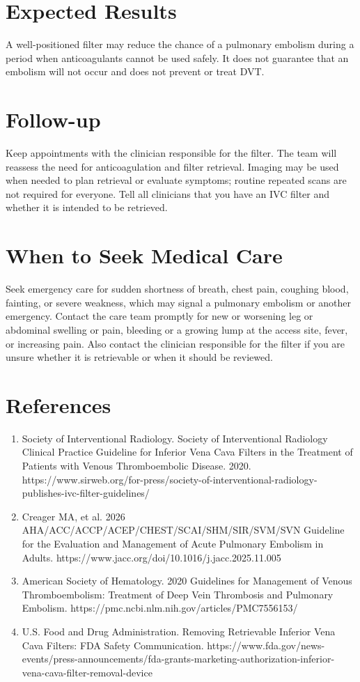 \section*{Expected Results}
A well-positioned filter may reduce the chance of a pulmonary embolism during a period when anticoagulants cannot be used safely. It does not guarantee that an embolism will not occur and does not prevent or treat DVT.

\section*{Follow-up}
Keep appointments with the clinician responsible for the filter. The team will reassess the need for anticoagulation and filter retrieval. Imaging may be used when needed to plan retrieval or evaluate symptoms; routine repeated scans are not required for everyone. Tell all clinicians that you have an IVC filter and whether it is intended to be retrieved.

\section*{When to Seek Medical Care}
Seek emergency care for sudden shortness of breath, chest pain, coughing blood, fainting, or severe weakness, which may signal a pulmonary embolism or another emergency. Contact the care team promptly for new or worsening leg or abdominal swelling or pain, bleeding or a growing lump at the access site, fever, or increasing pain. Also contact the clinician responsible for the filter if you are unsure whether it is retrievable or when it should be reviewed.

\section*{References}
\begin{enumerate}
  \item Society of Interventional Radiology. Society of Interventional Radiology Clinical Practice Guideline for Inferior Vena Cava Filters in the Treatment of Patients with Venous Thromboembolic Disease. 2020. https://www.sirweb.org/for-press/society-of-interventional-radiology-publishes-ivc-filter-guidelines/
  \item Creager MA, et al. 2026 AHA/ACC/ACCP/ACEP/CHEST/SCAI/SHM/SIR/SVM/SVN Guideline for the Evaluation and Management of Acute Pulmonary Embolism in Adults. https://www.jacc.org/doi/10.1016/j.jacc.2025.11.005
  \item American Society of Hematology. 2020 Guidelines for Management of Venous Thromboembolism: Treatment of Deep Vein Thrombosis and Pulmonary Embolism. https://pmc.ncbi.nlm.nih.gov/articles/PMC7556153/
  \item U.S. Food and Drug Administration. Removing Retrievable Inferior Vena Cava Filters: FDA Safety Communication. https://www.fda.gov/news-events/press-announcements/fda-grants-marketing-authorization-inferior-vena-cava-filter-removal-device
\end{enumerate}

\clearpage
